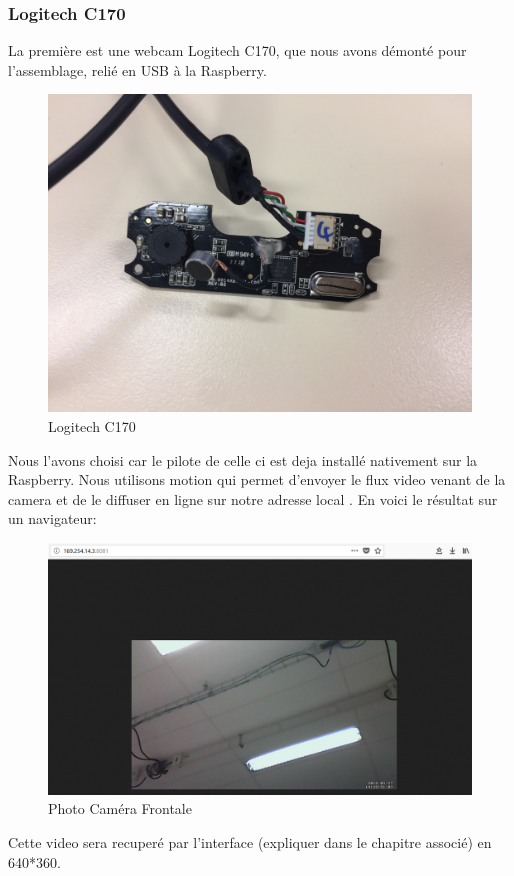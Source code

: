 \documentclass[a4paper,11pt]{report}
\begin{document}
				\subsubsection{Logitech C170}
					La première est une webcam Logitech C170, que nous avons démonté pour l'assemblage, relié en USB à la Raspberry. 
					\begin{figure}[!h]
					\begin{center}
						\includegraphics[scale=0.1]{Photos/Camera11.jpg}
						\caption{Logitech C170}
					\end{center}
				\end{figure}
				\newline Nous l'avons choisi car le pilote de celle ci est deja installé nativement sur la Raspberry. Nous utilisons motion qui permet d'envoyer le flux video venant de la camera et de le diffuser en ligne sur notre adresse local \cite{ref1}. En voici le résultat sur un navigateur:
				\begin{figure}[!h]
					\begin{center}
						\includegraphics[scale=0.4]{Photos/Camera1.png}
						\caption{Photo Caméra Frontale}
					\end{center}
				\end{figure}
				\newline Cette video sera recuperé par l'interface (expliquer dans le chapitre associé) en 640*360.
				
\end{document}
